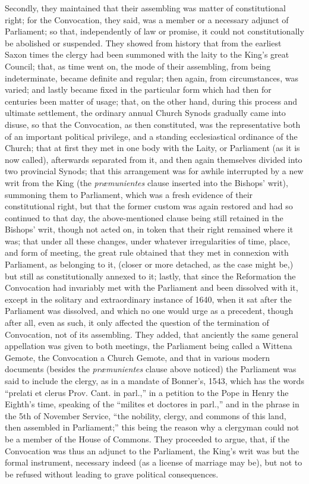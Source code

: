 Secondly, they maintained that
their assembling was matter of constitutional right; for the
Convocation, they said, was a member or a necessary adjunct of
Parliament; so that, independently of law or promise, it could not
constitutionally be abolished or suspended. They showed from history
that from the earliest Saxon times the clergy had been summoned with
the laity to the King's great Council; that, as time went on, the mode
of their assembling, from being indeterminate, became definite and
regular; then again, from circumstances, was varied; and lastly became
fixed in the particular form which had then for centuries been matter
of usage; that, on the other hand, during this process and ultimate
settlement, the ordinary annual Church Synods gradually came into
disuse, so that the Convocation, as then constituted, was the
representative both of an important political privilege, and a
standing ecclesiastical ordinance of the Church; that at first they
met in one body with the Laity, or Parliament (as it is now called),
afterwards separated from it, and then again themselves divided into
two provincial Synods; that this arrangement was for awhile
interrupted by a new writ from the King (the \emph{præmunientes}
clause inserted into the Bishops' writ), summoning them to Parliament,
which was a fresh evidence of their constitutional right, but that the
former custom was again restored and had so continued to that day, the
above-mentioned clause being still retained in the Bishops' writ,
though not acted on, in token that their right remained where it was;
that under all these changes, under whatever irregularities of time,
place, and form of meeting, the great rule obtained that they met in
connexion with Parliament, as belonging to it, (closer or more
detached, as the case might be,) but still as constitutionally annexed
to it; lastly, that since the Reformation the Convocation had
invariably met with the Parliament and been dissolved with it, except
in the solitary and extraordinary instance of 1640, when it sat after
the Parliament was dissolved, and which no one would urge as a
precedent, though after all, even as such, it only affected the
question of the termination of Convocation, not of its assembling.
They added, that anciently the same general appellation was given to
both meetings, the Parliament being called a Wittena Gemote, the
Convocation a Church Gemote, and that in various modern documents
(besides the \emph{præmunientes} clause above noticed) the Parliament
was said to include the clergy, as in a mandate of Bonner's, 1543,
which has the words ``prelati et clerus Prov. Cant. in parl.,'' in a
petition to the Pope in Henry the Eighth's time, speaking of the ``milites
et doctores in parl.,'' and in the phrase in the 5th of November
Service, ``the nobility, clergy, and commons of this land, then
assembled in Parliament;'' this being the reason why a clergyman could
not be a member of the House of Commons. They proceeded to argue,
that, if the Convocation was thus an adjunct to the Parliament,
the King's writ was but the formal instrument, necessary indeed (as a
license of marriage may be), but not to be refused without leading to
grave political consequences.

